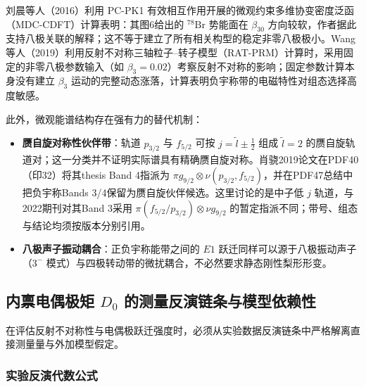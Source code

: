 刘晨等人（2016）利用 PC-PK1 有效相互作用开展的微观约束多维协变密度泛函（MDC-CDFT）计算表明：其图6给出的 $^{78}\mathrm{Br}$ 势能面在 $\beta_{30}$ 方向较软，作者据此支持八极关联的解释；这不等于建立了所有相关构型的稳定非零八极极小。Wang 等人（2019）利用反射不对称三轴粒子--转子模型（RAT-PRM）计算时，采用固定的非零八极参数输入（如 $\beta_3=0.02$）考察反射不对称的影响；固定参数计算本身没有建立 $\beta_3$ 运动的完整动态涨落，计算表明负宇称带的电磁特性对组态选择高度敏感。

此外，微观能谱结构存在强有力的替代机制：
\begin{itemize}
\item \textbf{赝自旋对称性伙伴带}：轨道 $p_{3/2}$ 与 $f_{5/2}$ 可按 $j=\tilde l\pm\tfrac12$ 组成 $\tilde l=2$ 的赝自旋轨道对；这一分类并不证明实际谱具有精确赝自旋对称。肖骁2019论文在PDF40（印32）将其thesis Band 4指派为 $\pi g_{9/2}\otimes\nu(p_{3/2},f_{5/2})$，并在PDF47总结中把负宇称Bands 3/4保留为赝自旋伙伴候选。这里讨论的是中子低 $j$ 轨道，与2022期刊对其Band 3采用 $\pi(f_{5/2}/p_{3/2})\otimes\nu g_{9/2}$ 的暂定指派不同；带号、组态与结论均须按版本分别引用。
\item \textbf{八极声子振动耦合}：正负宇称能带之间的 $E1$ 跃迁同样可以源于八极振动声子（$3^-$ 模式）与四极转动带的微扰耦合，不必然要求静态刚性梨形形变。
\end{itemize}

\subsection{内禀电偶极矩 $D_0$ 的测量反演链条与模型依赖性}\label{sec:4-5-5}

在评估反射不对称性与电偶极跃迁强度时，必须从实验数据反演链条中严格解离直接测量量与外加模型假定。

\subsubsection{实验反演代数公式}

